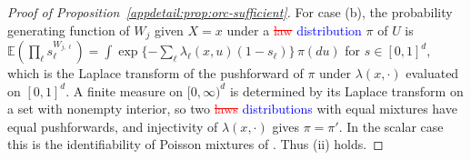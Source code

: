 \begin{proof}[Proof of Proposition~\ref{appdetail:prop:orc-sufficient}]
For case (b), the probability generating function of $W_j$ given $X=x$ under a \textcolor{red}{\sout{law}} \textcolor{blue}{distribution} $\pi$ of $U$ is $\mathbb E(\prod_\ell s_\ell^{W_{j,\ell}})=\int\exp\{-\sum_\ell\lambda_\ell(x,u)(1-s_\ell)\}\,\pi(du)$ for $s\in[0,1]^{d}$, which is the Laplace transform of the pushforward of $\pi$ under $\lambda(x,\cdot)$ evaluated on $[0,1]^{d}$. A finite measure on $[0,\infty)^{d}$ is determined by its Laplace transform on a set with nonempty interior, so two \textcolor{red}{\sout{laws}} \textcolor{blue}{distributions} with equal mixtures have equal pushforwards, and injectivity of $\lambda(x,\cdot)$ gives $\pi=\pi'$. In the scalar case this is the identifiability of Poisson mixtures of \citet{teicher1961identifiability}. Thus (ii) holds.

\end{proof}

